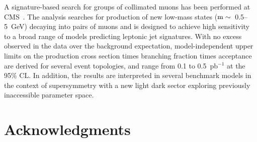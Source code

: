 \documentclass[11pt]{article}
\def\pb{pb$^{-1}$\xspace}
\begin{document}
A signature-based search for groups of collimated muons has been performed at CMS~\cite{CMSPAPER:EXO-11-013}.
The analysis searches for production of new low-mass states ($\rm{m} \sim$~0.5--5~GeV) decaying 
into pairs of muons and is designed to achieve high sensitivity to a broad range of models 
predicting leptonic jet signatures. 
With no excess observed in the data over the background expectation, model-independent 
upper limits on the production cross section times branching fraction times acceptance are 
derived for several event topologies, and range from 0.1 to 0.5~\pb at the 95\% CL. 
In addition, the results are interpreted in several benchmark models 
in the context of supersymmetry with a new light dark sector 
exploring previously inaccessible parameter space. 



\section*{Acknowledgments}
\end{document}
